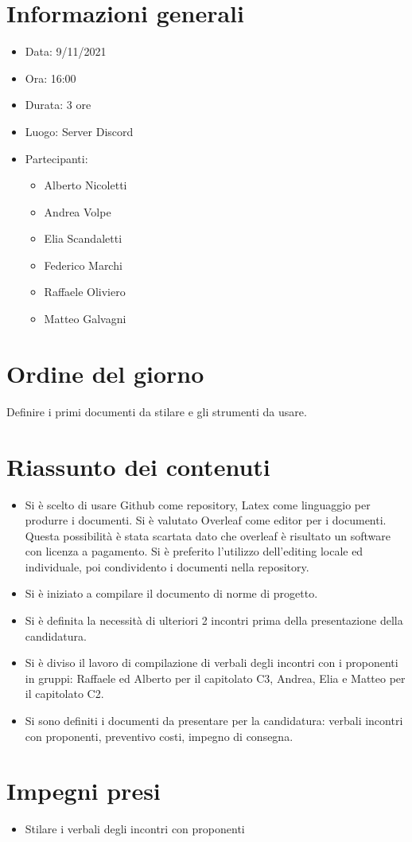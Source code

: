 \documentclass[a4paper,12pt]{article}
\begin{document}

\section{Informazioni generali}

\begin{itemize}
\item Data: 9/11/2021
\item Ora: 16:00
\item Durata: 3 ore
\item Luogo: Server Discord
\item Partecipanti: 
\begin{itemize}
\item Alberto Nicoletti
\item Andrea Volpe
\item Elia Scandaletti
\item Federico Marchi
\item Raffaele Oliviero
\item Matteo Galvagni
\end{itemize}
\end{itemize}

\section{Ordine del giorno}
Definire i primi documenti da stilare e gli strumenti da usare.

\section{Riassunto dei contenuti}

\begin{itemize}
\item Si è scelto di usare Github come repository, Latex come linguaggio per produrre i documenti. Si è valutato Overleaf come editor per i documenti. Questa possibilità è stata scartata dato che overleaf è risultato un software con licenza a pagamento. Si è preferito l'utilizzo dell'editing locale ed individuale, poi condividento i documenti nella repository.
\item Si è iniziato a compilare il documento di norme di progetto.
\item Si è definita la necessità di ulteriori 2 incontri prima della presentazione della candidatura.
\item Si è diviso il lavoro di compilazione di verbali degli incontri con i proponenti in gruppi: Raffaele ed Alberto per il capitolato C3, Andrea, Elia e Matteo per il capitolato C2.
\item Si sono definiti i documenti da presentare per la candidatura: verbali incontri con proponenti, preventivo costi, impegno di consegna.
\end{itemize}

\section{Impegni presi}
\begin{itemize}
\item{Stilare i verbali degli incontri con proponenti}
\end{itemize}
\end{document}
